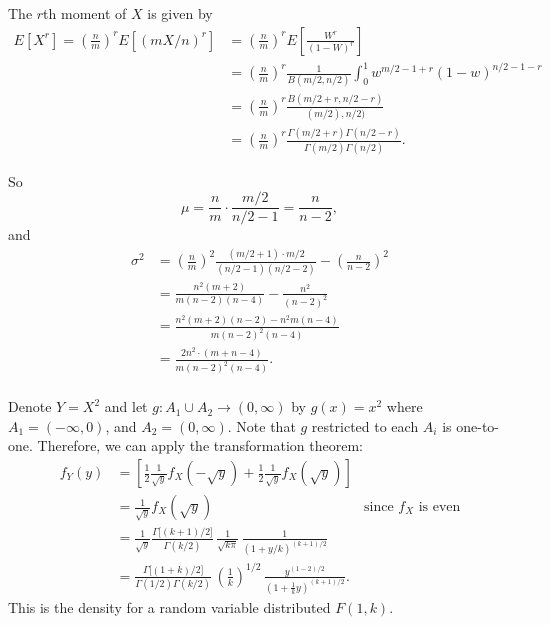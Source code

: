 \documentclass{stat_homework}
\begin{document}
\begin{solution}
  The $r$th moment of $X$ is given by 
  {\small
  \begin{align*}
    E\left[X^r\right] 
    = \left(\frac nm\right)^r E\left[(mX/n)^r\right] 
    &= \left(\frac nm\right)^r E\left[ \frac {W^r}{(1-W)^r} \right] \\
    &= \left(\frac nm\right)^r\frac{1}{B(m/2,n/2)} \int_0^1 w^{m/2-1 + r} (1-w)^{n/2-1 - r}\\
    &= \left(\frac nm\right)^r\frac{B(m/2+r,n/2-r)}{(m/2),n/2)}\\
    &= \left(\frac nm\right)^r\frac{\Gamma(m/2 +r)\Gamma(n/2 -r)}{\Gamma(m/2)\Gamma(n/2)}.
  \end{align*}
  }

  So
  $$
    \mu = \frac nm\cdot \frac{m/2}{n/2-1} = \frac n{n-2},
  $$
  and
  \begin{align*}
    \sigma^2 
    &= \left(\frac nm \right)^2 \frac{(m/2 +1)\cdot m/2}{(n/2 - 1)(n/2-2)} - \left(\frac{n}{n-2}\right)^2 \\
    &= \frac{n^2(m+2)}{m(n - 2)(n-4)} - \frac{n^2}{(n-2)^2} \\
    &= \frac{n^2(m+2)(n-2) -  n^2m (n-4)}{m(n-2)^2(n-4)} \\
    &= \frac{2n^2\cdot\left(m +n-4\right)}{m(n-2)^2(n-4)}. \\
  \end{align*}
\end{solution}


\begin{solution}
  Denote $Y = X^2$ and let $g:A_1\cup A_2\to(0,\infty)$ by $g(x) = x^2$ where $A_1 = (-\infty,0)$, and $A_2=(0,\infty)$.  Note that $g$ restricted to each $A_i$ is one-to-one.  Therefore, we can apply the transformation theorem:
  \begin{align*}
    f_Y(y) &= \left[\frac 12 \frac 1{\sqrt{y}} f_X(-\sqrt y) + \frac 12 \frac 1{\sqrt{y}} f_X(\sqrt y) \right]\\
    &= \frac 1{\sqrt{y}} f_X(\sqrt y) &\text{since $f_X$ is even}\\ 
    &= \frac 1{\sqrt{y}} \frac{\Gamma\big[(k+1)/2\big]}{\Gamma(k/2)} \, \frac 1{\sqrt{k\pi}}\,\frac {1}{(1+y/k)^{(k+1)/2}}\\
    &= \frac{\Gamma\big[(1+k)/2\big]}{\Gamma(1/2)\Gamma(k/2)} \, \left(\frac 1k\right)^{1/2}\,\frac {y^{(1-2)/2}}{(1+\frac 1k y)^{(k+1)/2}}.
  \end{align*}
  This is the density for a random variable distributed $F(1,k)$.
\end{solution}
\end{document}
